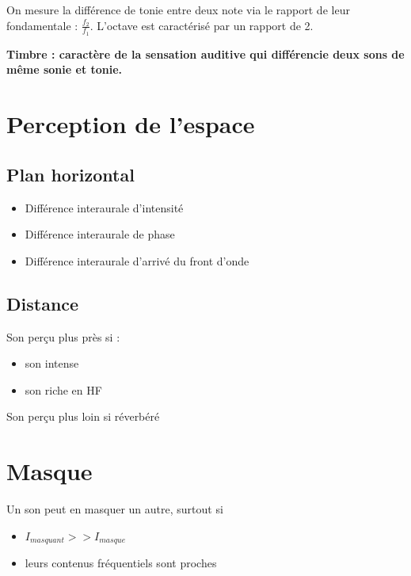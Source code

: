\documentclass[a4paper, 11pt]{article}
\begin{document}
    On mesure la différence de tonie entre deux note via le rapport de leur fondamentale : $\frac{f_2}{f_1}$. L'octave est caractérisé par un rapport de 2.

    {\bf Timbre : caractère de la sensation auditive qui différencie deux sons de même sonie et tonie.}

    \section{Perception de l'espace}

    \subsection{Plan horizontal}

    \begin{itemize}
        \item Différence interaurale d'intensité
        \item Différence interaurale de phase
        \item Différence interaurale d'arrivé du front d'onde
    \end{itemize}

    \subsection{Distance}

    Son perçu plus près si :
    \begin{itemize}
        \item son intense
        \item son riche en HF
    \end{itemize}

    Son perçu plus loin si réverbéré

    \section{Masque}

    Un son peut en masquer un autre, surtout si
    \begin{itemize}
        \item $I_{masquant} >> I_{masque}$
        \item leurs contenus fréquentiels sont proches
    \end{itemize}
\end{document}
